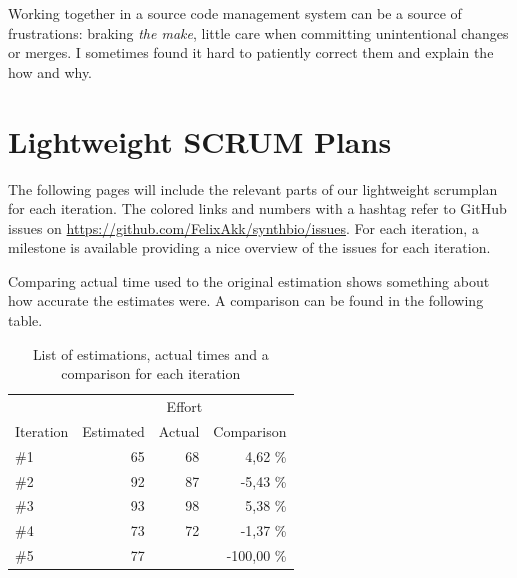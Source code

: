 \documentclass[a4paper]{article}
\begin{document}
Working together in a source code management system can be a source of frustrations: braking \textit{the make}, little care when committing unintentional changes or merges. I sometimes found it hard to patiently correct them and explain the how and why.



\section{Lightweight SCRUM Plans}
\label{scrumplans}
The following pages will include the relevant parts of our lightweight scrumplan for each iteration. The colored links and numbers with a hashtag refer to GitHub issues on \url{https://github.com/FelixAkk/synthbio/issues}. For each iteration, a milestone is available providing a nice overview of the issues for each iteration.

Comparing actual time used to the original estimation shows something about how accurate the estimates were. A comparison can be found in the following table.
\begin{table}[h!]

\centering\begin{tabular}{lrrr}
 & \multicolumn{3}{c}{Effort} \\
 \cline{2-4}
Iteration & Estimated & Actual & Comparison \\
\hline
\#1 & 65 & 68 & 4,62 \% \\
\#2 & 92 & 87 & -5,43 \% \\
\#3 & 93 & 98 & 5,38 \% \\
\#4 & 73 & 72 & -1,37 \% \\
\#5 & 77 &  & -100,00 \% \\\hline
\end{tabular}
\caption{List of estimations, actual times and a comparison for each iteration}
\end{table}










\end{document}
